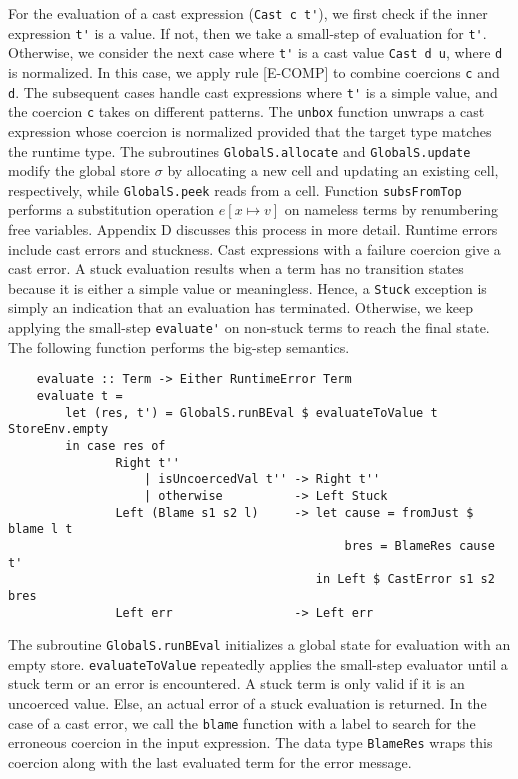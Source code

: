 For the evaluation of a cast expression (\lstinline{Cast c t'}), 
we first check if the inner expression \lstinline{t'} is a value. If not, then 
we take a small-step of evaluation for \lstinline{t'}. Otherwise, 
we consider the next case where \lstinline{t'} is a cast value   
\lstinline{Cast d u}, where \lstinline{d} is normalized. In this 
case, we apply rule {\scriptsize{[E-COMP]}} to combine coercions \lstinline{c} 
and \lstinline{d}. The subsequent cases handle cast expressions where 
\lstinline{t'} is a simple value, and the coercion \lstinline{c} takes 
on different patterns. The 
\lstinline{unbox} function unwraps a cast expression whose coercion is normalized 
provided that the target type matches the runtime type.    
The subroutines \lstinline{GlobalS.allocate} and \lstinline{GlobalS.update} 
modify the global store $\sigma$ by allocating a new cell and 
updating an existing cell, respectively, while \lstinline{GlobalS.peek} 
reads from a cell. Function \lstinline{subsFromTop} 
performs a substitution 
operation $e[x \mapsto v]$ on nameless terms by renumbering 
free variables. Appendix D discusses this process in more detail. 
Runtime errors include cast errors and stuckness. Cast expressions 
with a failure coercion give a cast error. 
A stuck evaluation results when a term has no transition states 
because it is either a simple value or meaningless. Hence, a \lstinline{Stuck} 
exception is simply an indication that an evaluation has 
terminated. Otherwise, 
we keep applying the small-step \lstinline{evaluate'} on non-stuck terms 
to reach the final state. The following 
function performs the big-step semantics. 

\begin{lstlisting}
    evaluate :: Term -> Either RuntimeError Term
    evaluate t = 
        let (res, t') = GlobalS.runBEval $ evaluateToValue t StoreEnv.empty
        in case res of
               Right t'' 
                   | isUncoercedVal t'' -> Right t''
                   | otherwise          -> Left Stuck 
               Left (Blame s1 s2 l)     -> let cause = fromJust $ blame l t
                                               bres = BlameRes cause t'
                                           in Left $ CastError s1 s2 bres  
               Left err                 -> Left err 
\end{lstlisting}

The subroutine \lstinline{GlobalS.runBEval} initializes a global state 
for evaluation with an empty store. \lstinline{evaluateToValue} repeatedly 
applies the small-step evaluator until a stuck term or an error is encountered. 
A stuck term is only valid if it is an uncoerced value. Else, an actual error 
of a stuck evaluation is returned. In the case of a cast error, we call the 
\lstinline{blame} function with a label to search for the erroneous 
coercion in the input expression. The data type \lstinline{BlameRes} 
wraps this coercion along with the last evaluated term for the error message. 

